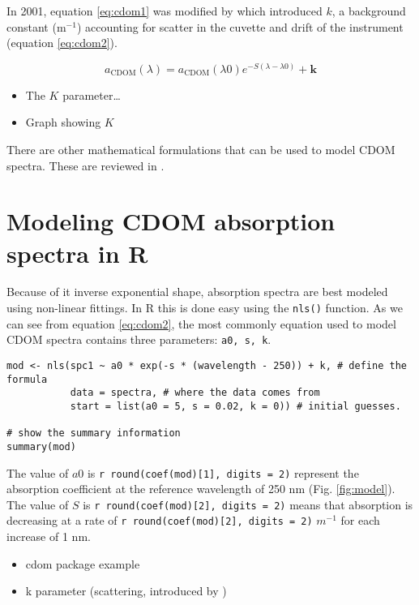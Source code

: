 \documentclass[]{book}
\providecommand{\tightlist}{%
  \setlength{\itemsep}{0pt}\setlength{\parskip}{0pt}}
\theoremstyle{definition}
\theoremstyle{definition}
\theoremstyle{remark}
\begin{document}
In 2001, equation \eqref{eq:cdom1} was modified by \citet{Stedmon2001}
which introduced \(k\), a background constant (m\(^{-1}\)) accounting
for scatter in the cuvette and drift of the instrument (equation
\eqref{eq:cdom2}).

\begin{equation}
a_{\text{CDOM}}(\lambda) = a_{\text{CDOM}}(\lambda0)e^{-S(\lambda - \lambda0)} + \mathbf{k}
\label{eq:cdom2}
\end{equation}

\begin{itemize}
\tightlist
\item
  The \(K\) parameter\ldots{}
\item
  Graph showing \(K\)
\end{itemize}

There are other mathematical formulations that can be used to model CDOM
spectra. These are reviewed in \citet{Twardowski2004}.

\section{Modeling CDOM absorption spectra in R}\label{sl}

Because of it inverse exponential shape, absorption spectra are best
modeled using non-linear fittings. In R this is done easy using the
\texttt{nls()} function. As we can see from equation \eqref{eq:cdom2}, the
most commonly equation used to model CDOM spectra contains three
parameters: \texttt{a0,\ s,\ k}.

\begin{verbatim}
mod <- nls(spc1 ~ a0 * exp(-s * (wavelength - 250)) + k, # define the formula
           data = spectra, # where the data comes from
           start = list(a0 = 5, s = 0.02, k = 0)) # initial guesses.

# show the summary information
summary(mod)
\end{verbatim}

The value of \(a0\) is
\texttt{r\ round(coef(mod){[}1{]},\ digits\ =\ 2)} represent the
absorption coefficient at the reference wavelength of 250 nm (Fig.
\ref{fig:model}). The value of \(S\) is
\texttt{r\ round(coef(mod){[}2{]},\ digits\ =\ 2)} means that absorption
is decreasing at a rate of
\texttt{r\ round(coef(mod){[}2{]},\ digits\ =\ 2)} \(m^{-1}\) for each
increase of 1 nm.

\begin{itemize}
\item
  cdom package example
\item
  k parameter (scattering, introduced by \citet{Stedmon2001})
\end{itemize}
\end{document}
